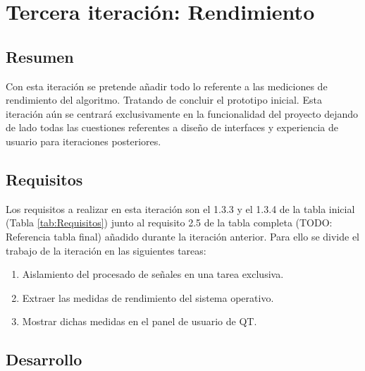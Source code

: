
\section{Tercera iteración: Rendimiento}
    \subsection{Resumen}
        
        Con esta iteración se pretende añadir todo lo referente a las mediciones de rendimiento del algoritmo. Tratando de concluir el prototipo inicial. Esta iteración aún se centrará exclusivamente en la funcionalidad del proyecto dejando de lado todas las cuestiones referentes a diseño de interfaces y experiencia de usuario para iteraciones posteriores.
        
    \subsection{Requisitos}

        Los requisitos a realizar en esta iteración son el 1.3.3 y el 1.3.4 de la tabla inicial (Tabla \ref{tab:Requisitos}) junto al requisito 2.5 de la tabla completa (TODO: Referencia tabla final) añadido durante la iteración anterior. Para ello se divide el trabajo de la iteración en las siguientes tareas:

        \begin{enumerate}
            \item Aislamiento del procesado de señales en una tarea exclusiva.
            \item Extraer las medidas de rendimiento del sistema operativo.
            \item Mostrar dichas medidas en el panel de usuario de QT.
        \end{enumerate}
        
    \subsection{Desarrollo}
        
